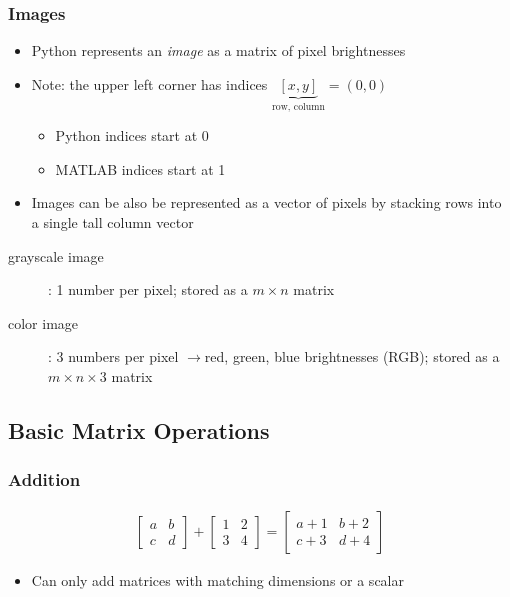 \documentclass[letterpaper,12pt]{article}
\newcommand{\lra}{\ensuremath{\longrightarrow{}}}
\begin{document}
\subsubsection{Images}
\begin{itemize}
 \item Python represents an \textit{image} as a matrix of pixel brightnesses
 \item Note: the upper left corner has indices $\underbrace{[x,y]}_\text{row, column} = (0,0)$
       \begin{itemize}
        \item Python indices start at 0
        \item MATLAB indices start at 1
       \end{itemize}
 \item Images can be also be represented as a vector of pixels by stacking rows into a single tall column vector
\end{itemize}

\begin{description}
 \item[grayscale image]: 1 number per pixel; stored as a $m \times n$ matrix
 \item[color image]: 3 numbers per pixel \lra red, green, blue brightnesses (RGB); stored as a $m \times n \times 3$ matrix
\end{description}

\subsection{Basic Matrix Operations}
\subsubsection{Addition}
\begin{align}
 \begin{bmatrix}
  a & b \\
  c & d
 \end{bmatrix}
 + \begin{bmatrix}
  1 & 2 \\
  3 & 4
 \end{bmatrix}
 = \begin{bmatrix}
  a + 1 & b + 2 \\
  c + 3 & d + 4
 \end{bmatrix}
\end{align}
\begin{itemize}
 \item Can only add matrices with matching dimensions or a scalar
\end{itemize}
\end{document}
